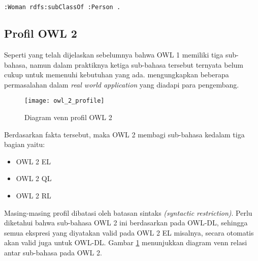 \begin{lstlisting}[language=XML, caption=contoh sintak turtle, xleftmargin=0pt]
	:Woman rdfs:subClassOf :Person .
\end{lstlisting}

\subsection{Profil OWL 2}
Seperti yang telah dijelaskan sebelumnya bahwa OWL 1 memiliki tiga sub-bahasa, namun dalam praktiknya ketiga sub-bahasa tersebut ternyata belum cukup untuk memenuhi kebutuhan yang ada. \citet{patel} mengungkapkan beberapa permasalahan dalam \emph{real world application} yang diadapi para pengembang.

\begin{figure}[htp]
	\centering
	\texttt{[image: owl\_2\_profile]}
	\caption{Diagram venn profil OWL 2}
	\label{fig:owl_2_profile}
\end{figure}

Berdasarkan fakta tersebut, maka OWL 2 membagi sub-bahasa kedalam tiga bagian yaitu:
\begin{itemize}
	\item OWL 2 EL
	\item OWL 2 QL
	\item OWL 2 RL
\end{itemize}

Masing-masing profil dibatasi oleh batasan sintaks \emph{(syntactic restriction)}. Perlu diketahui bahwa sub-bahasa OWL 2 ini berdasarkan pada OWL-DL, sehingga semua ekspresi yang diyatakan valid pada OWL 2 EL misalnya, secara otomatis akan valid juga untuk OWL-DL. Gambar \ref{fig:owl_2_profile} menunjukkan diagram venn relasi antar sub-bahasa pada OWL 2.